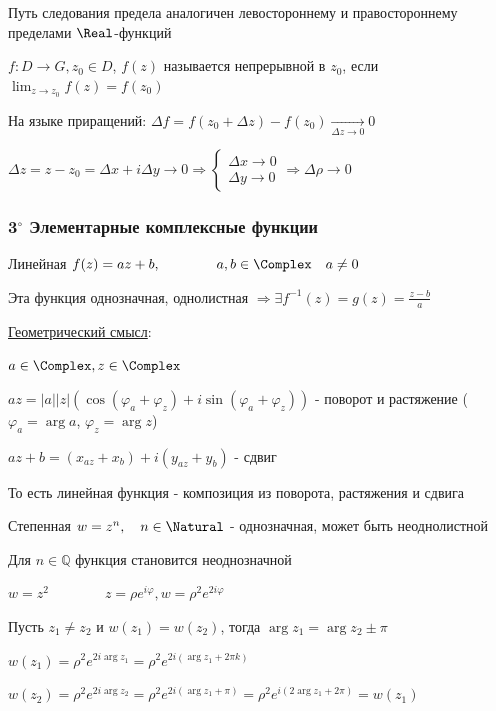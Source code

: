\Nota Путь следования предела аналогичен левостороннему и правостороннему пределами $\Real$-функций


$f : D \longrightarrow G, z_0 \in D$, $f(z)$ называется непрерывной в $z_0$, если $\lim_{z \to z_0} f(z) = f(z_0)$

На языке приращений: $\Delta f = f(z_0 + \Delta z) - f(z_0) \underset{\Delta z \to 0}{\longrightarrow} 0$

$\Delta z = z - z_0 = \Delta x + i \Delta y \to 0 \Longrightarrow 
\begin{cases}\Delta x \to 0 \\ \Delta y \to 0\end{cases} \Longrightarrow 
\Delta \rho \to 0$

\subsubsection{3$^\circ$ Элементарные комплексные функции}

 Линейная $f(z) = az + b, \qquad\qquad a, b \in \Complex \quad a \neq 0$

Эта функция однозначная, однолистная $\Longrightarrow \exists f^{-1}(z) = g(z) = \frac{z - b}{a}$

\underline{Геометрический смысл}:

$a \in \Complex, z \in \Complex$

$az = |a| |z| (\cos (\varphi_a + \varphi_z) + i \sin (\varphi_a + \varphi_z))$ - поворот и растяжение 
($\varphi_a = \arg a$, $\varphi_z = \arg z$)

$az + b = (x_{az} + x_b) + i (y_{az} + y_b)$ - сдвиг

То есть линейная функция - композиция из поворота, растяжения и сдвига

 Степенная $w = z^n, \quad n \in \Natural$ - однозначная, может быть неоднолистной

Для $n \in \mathbb{Q}$ функция становится неоднозначной

\Exs $w = z^2 \qquad\qquad z = \rho e^{i\varphi}, w = \rho^2 e^{2i\varphi}$

Пусть $z_1 \neq z_2$ и $w(z_1) = w(z_2)$, тогда $\arg z_1 = \arg z_2 \pm \pi$ 

$w(z_1) = \rho^2 e^{2i\arg z_1} = \rho^2 e^{2i (\arg z_1 + 2\pi k)}$

$w(z_2) = \rho^2 e^{2i\arg z_2} = \rho^2 e^{2i (\arg z_1 + \pi)} = \rho^2 e^{i (2\arg z_1 + 2\pi)} = w(z_1)$

